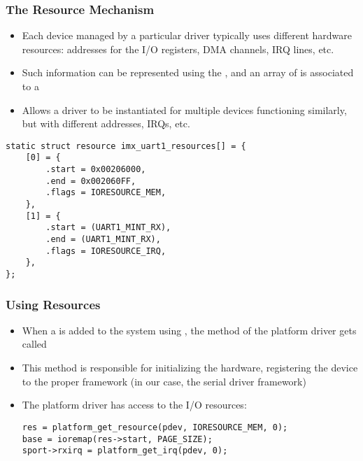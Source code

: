 \begin{frame}[fragile]
  \frametitle{The Resource Mechanism}
  \begin{itemize}
  \item Each device managed by a particular driver typically uses
    different hardware resources: addresses for the I/O registers, DMA
    channels, IRQ lines, etc.
  \item Such information can be represented using the
    , and an array of  is
    associated to a 
  \item Allows a driver to be instantiated for multiple devices
    functioning similarly, but with different addresses, IRQs, etc.
  \end{itemize}
  \begin{verbatim}
static struct resource imx_uart1_resources[] = {
    [0] = {
        .start = 0x00206000,
        .end = 0x002060FF,
        .flags = IORESOURCE_MEM,
    },
    [1] = {
        .start = (UART1_MINT_RX),
        .end = (UART1_MINT_RX),
        .flags = IORESOURCE_IRQ,
    },
};
  \end{verbatim}
\end{frame}

\begin{frame}[fragile]
  \frametitle{Using Resources}
  \begin{itemize}
  \item When a  is added to the system using
    , the  method of the
    platform driver gets called
  \item This method is responsible for initializing the hardware,
    registering the device to the proper framework (in our case, the
    serial driver framework)
  \item The platform driver has access to the I/O resources:
  \begin{verbatim}
res = platform_get_resource(pdev, IORESOURCE_MEM, 0);
base = ioremap(res->start, PAGE_SIZE);
sport->rxirq = platform_get_irq(pdev, 0);
  \end{verbatim}
  \end{itemize}
\end{frame}

